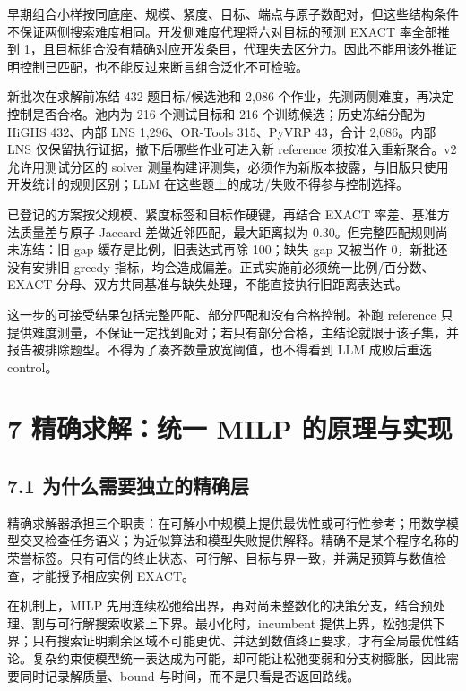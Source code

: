 \documentclass[UTF8,10pt,a4paper,fontset=fandol]{ctexart}
\begin{document}

早期组合小样按同底座、规模、紧度、目标、端点与原子数配对，但这些结构条件不保证两侧搜索难度相同。开发侧难度代理将六对目标的预测 EXACT 率全部推到 1，且目标组合没有精确对应开发条目，代理失去区分力。因此不能用该外推证明控制已匹配，也不能反过来断言组合泛化不可检验。


新批次在求解前冻结 432 题目标/\allowbreak{}候选池和 2,086 个作业，先测两侧难度，再决定控制是否合格。池内为 216 个测试目标和 216 个训练候选；历史冻结分配为 HiGHS 432、内部 LNS 1,296、OR-Tools 315、PyVRP 43，合计 2,086。内部 LNS 仅保留执行证据，撤下后哪些作业可进入新 reference 须按准入重新聚合。v2 允许用测试分区的 solver 测量构建评测集，必须作为新版本披露，与旧版只使用开发统计的规则区别；LLM 在这些题上的成功/\allowbreak{}失败不得参与控制选择。


已登记的方案按父规模、紧度标签和目标作硬键，再结合 EXACT 率差、基准方法质量差与原子 Jaccard 差做近邻匹配，最大距离拟为 0.30。但完整匹配规则尚未冻结：旧 gap 缓存是比例，旧表达式再除 100；缺失 gap 又被当作 0，新批还没有安排旧 greedy 指标，均会造成偏差。正式实施前必须统一比例/\allowbreak{}百分数、EXACT 分母、双方共同基准与缺失处理，不能直接执行旧距离表达式。


这一步的可接受结果包括完整匹配、部分匹配和没有合格控制。补跑 reference 只提供难度测量，不保证一定找到配对；若只有部分合格，主结论就限于该子集，并报告被排除题型。不得为了凑齐数量放宽阈值，也不得看到 LLM 成败后重选 control。


\section*{7 精确求解：统一 MILP 的原理与实现}


\subsection*{7.1 为什么需要独立的精确层}


精确求解器承担三个职责：在可解小中规模上提供最优性或可行性参考；用数学模型交叉检查任务语义；为近似算法和模型失败提供解释。精确不是某个程序名称的荣誉标签。只有可信的终止状态、可行解、目标与界一致，并满足预算与数值检查，才能授予相应实例 EXACT。


在机制上，MILP 先用连续松弛给出界，再对尚未整数化的决策分支，结合预处理、割与可行解搜索收紧上下界。最小化时，incumbent 提供上界，松弛提供下界；只有搜索证明剩余区域不可能更优、并达到数值终止要求，才有全局最优性结论。复杂约束使模型统一表达成为可能，却可能让松弛变弱和分支树膨胀，因此需要同时记录解质量、bound 与时间，而不是只看是否返回路线。
\end{document}
